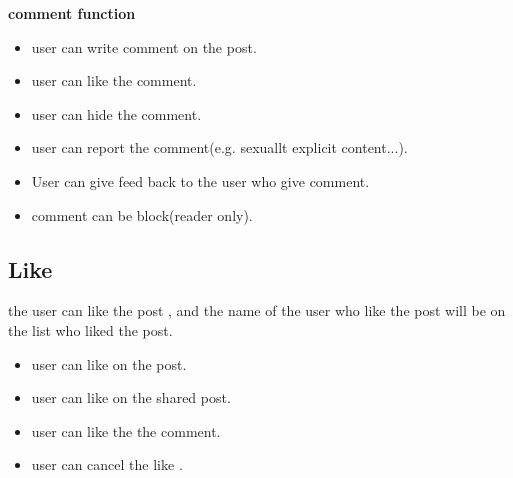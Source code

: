 \textbf{comment function}
\begin{itemize}
\item user can write comment on the post.
\item user can like the comment.
\item user can hide the comment.
\item user can report the comment(e.g. sexuallt explicit content...).
\item User can give feed back to the user who give comment.
\item comment can be block(reader only).
\end{itemize}

\subsection{Like}
the user can like the post , and the name of the user who like the post will be
on the list who liked the post.

\begin{itemize}
\item user can like on the post.
\item user can like on the shared post.
\item user can like the the comment.
\item user can cancel the like .
\end{itemize}
